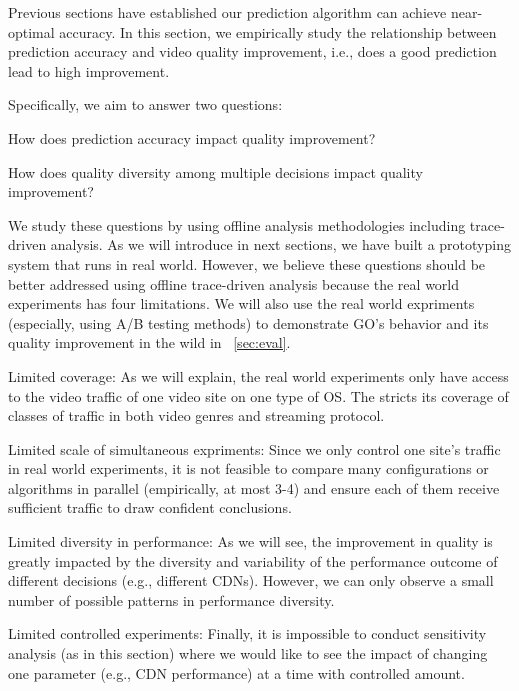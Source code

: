 \label{sec:improvement}

Previous sections have established our prediction algorithm can achieve near-optimal accuracy. In this section, we empirically study the relationship between prediction accuracy and video quality improvement, i.e., does a good prediction lead to high improvement. 

Specifically, we aim to answer two questions:
\begin{packedenumerate}
	\item How does prediction accuracy impact quality improvement?
	\item How does quality diversity among multiple decisions impact quality improvement?
\end{packedenumerate}

We study these questions by using offline analysis methodologies including trace-driven analysis. As we will introduce in next sections, we have built a prototyping system that runs in real world. However, we believe these questions should be better addressed using offline trace-driven analysis because the real world experiments has four limitations. We will also use the real world expriments (especially, using A/B testing methods) to demonstrate GO's behavior and its quality improvement in the wild in \Section~\ref{sec:eval}.
\begin{packedenumerate}
	\item Limited coverage: As we will explain, the real world experiments only have access to the video traffic of one video site on one type of OS. The stricts its coverage of classes of traffic in both video genres and streaming protocol.
	\item Limited scale of simultaneous expriments: Since we only control one site's traffic in real world experiments, it is not feasible to compare many configurations or algorithms in parallel (empirically, at most 3-4) and ensure each of them receive sufficient traffic to draw confident conclusions.
	\item Limited diversity in performance: As we will see, the improvement in quality is greatly impacted by the diversity and variability of the performance outcome of different decisions (e.g., different CDNs). However, we can only observe a small number of possible patterns in performance diversity.
	\item Limited controlled experiments: Finally, it is impossible to conduct sensitivity analysis (as in this section) where we would like to see the impact of changing one parameter (e.g., CDN performance) at a time with controlled amount.
\end{packedenumerate}


